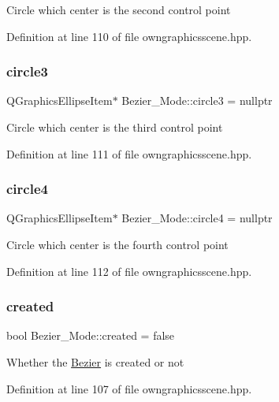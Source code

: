 Circle which center is the second control point 

Definition at line 110 of file owngraphicsscene.\+hpp.

\mbox{\label{structBezier__Mode_a342d3b970c6049b615ef356a902c0781}} 
\subsubsection{\texorpdfstring{circle3}{circle3}}
{\footnotesize\ttfamily Q\+Graphics\+Ellipse\+Item$\ast$ Bezier\+\_\+\+Mode\+::circle3 = nullptr}

Circle which center is the third control point 

Definition at line 111 of file owngraphicsscene.\+hpp.

\mbox{\label{structBezier__Mode_a6f26e1fe7da425063b792dab9f3c1099}} 
\subsubsection{\texorpdfstring{circle4}{circle4}}
{\footnotesize\ttfamily Q\+Graphics\+Ellipse\+Item$\ast$ Bezier\+\_\+\+Mode\+::circle4 = nullptr}

Circle which center is the fourth control point 

Definition at line 112 of file owngraphicsscene.\+hpp.

\mbox{\label{structBezier__Mode_ae2573f8601e7d9f439d2bfbc11c34ae9}} 
\subsubsection{\texorpdfstring{created}{created}}
{\footnotesize\ttfamily bool Bezier\+\_\+\+Mode\+::created = false}

Whether the \mbox{\hyperlink{classBezier}{Bezier}} is created or not 

Definition at line 107 of file owngraphicsscene.\+hpp.

\mbox{\label{structBezier__Mode_a2d7c5ccccb03114fd1b26a20843a59e4}} 

